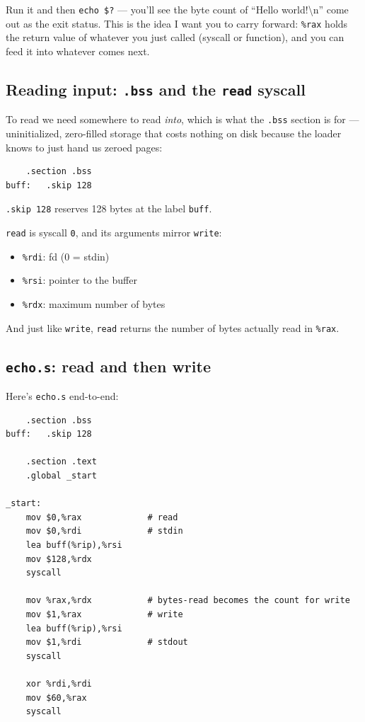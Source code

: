 \documentclass[11pt]{article}
\begin{document}
Run it and then \texttt{echo \$?} --- you'll see the byte count of
``Hello world!\textbackslash n'' come out as the exit status. This is
the idea I want you to carry forward: \texttt{\%rax} holds the return
value of whatever you just called (syscall or function), and you can
feed it into whatever comes next.

\subsection*{Reading input: \texttt{.bss} and the \texttt{read} syscall}

To read we need somewhere to read \emph{into}, which is what the
\texttt{.bss} section is for --- uninitialized, zero-filled storage
that costs nothing on disk because the loader knows to just hand us
zeroed pages:

\begin{lstlisting}
    .section .bss
buff:   .skip 128
\end{lstlisting}

\texttt{.skip 128} reserves 128 bytes at the label \texttt{buff}.

\texttt{read} is syscall \texttt{0}, and its arguments mirror
\texttt{write}:
\begin{itemize}
  \item \texttt{\%rdi}: fd (0 = stdin)
  \item \texttt{\%rsi}: pointer to the buffer
  \item \texttt{\%rdx}: maximum number of bytes
\end{itemize}
And just like \texttt{write}, \texttt{read} returns the number of
bytes actually read in \texttt{\%rax}.

\subsection*{\texttt{echo.s}: read and then write}

Here's \texttt{echo.s} end-to-end:

\begin{lstlisting}
    .section .bss
buff:   .skip 128

    .section .text
    .global _start

_start:
    mov $0,%rax             # read
    mov $0,%rdi             # stdin
    lea buff(%rip),%rsi
    mov $128,%rdx
    syscall

    mov %rax,%rdx           # bytes-read becomes the count for write
    mov $1,%rax             # write
    lea buff(%rip),%rsi
    mov $1,%rdi             # stdout
    syscall

    xor %rdi,%rdi
    mov $60,%rax
    syscall
\end{lstlisting}
\end{document}
